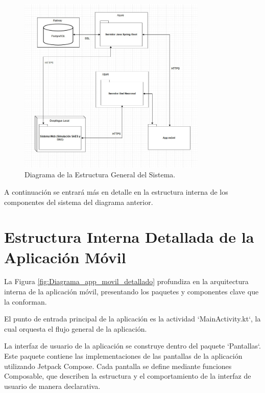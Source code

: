 \begin{figure}[htbp!]
	\begin{center}
		\includegraphics[width=0.8\textwidth]{images/DiagramaGeneralClases}
		\caption{Diagrama de la Estructura General del Sistema.}
		\label{fig:Diagrama de sistemas}
	\end{center}
\end{figure}

A continuación se entrará más en detalle en la estructura interna de los componentes del sistema del diagrama anterior.

\newpage


\newpage

\section{Estructura Interna Detallada de la Aplicación Móvil} 

La Figura \ref{fig:Diagrama_app_movil_detallado} profundiza en la arquitectura interna de la aplicación móvil, presentando los paquetes y componentes clave que la conforman. 

El punto de entrada principal de la aplicación es la actividad `MainActivity.kt`, la cual orquesta el flujo general de la aplicación. 

La interfaz de usuario de la aplicación se construye dentro del paquete `Pantallas`. Este paquete contiene las implementaciones de las pantallas de la aplicación utilizando Jetpack Compose. Cada pantalla se define mediante funciones Composable, que describen la estructura y el comportamiento de la interfaz de usuario de manera declarativa. 

